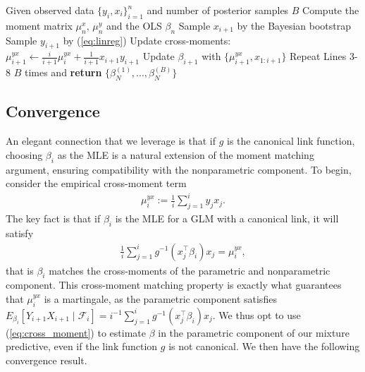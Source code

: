 \documentclass[11pt,a4paper]{article}
\theoremstyle{plain}
\theoremstyle{remark}
\theoremstyle{remark}
\begin{document}
\begin{algorithm}[!h]
\caption{Predictive resampling for GLM}\label{alg:linreg}
\begin{algorithmic}[1]
\State Given observed data $\{y_i, x_i\}_{i=1}^n$ and number of posterior samples $B$
\State Compute the moment matrix $ \mu_n^x ,\,\mu_n^y $ and the OLS $\beta_n$
        \State  Sample $x_{i+1}$ by the Bayesian bootstrap 
        \State  Sample $y_{i+1}$ by (\ref{eq:linreg}) 
        \State  Update cross-moments:
        $\mu^{yx}_{i+1} \gets \frac{i}{i+1}\mu^{yx}_{i} + \frac{1}{i+1}x_{i+1}y_{i+1} $
        \State Update $\beta_{i+1}$ with $\{\mu^{y x}_{i+1}, x_{1:i+1}\}$
  \EndFor
\State Repeat Lines 3-8 $B$ times and \textbf{return} $\{\beta^{(1)}_N,...,\beta^{(B)}_N\}$
\end{algorithmic}
\end{algorithm}



\subsection{Convergence}
An elegant connection that we leverage is that if $g$ is the canonical link function, choosing $\beta_i$ as the MLE is a natural extension of the moment matching argument, ensuring compatibility with the nonparametric component. To begin, consider the empirical cross-moment term
\begin{align*}
     \mu_i^{yx} := \frac{1}{i}\sum_{j = 1}^i y_j x_j.
\end{align*}
The key fact is that if $\beta_i$ is the MLE for a GLM with a canonical link, it will satisfy 
\begin{align}\label{eq:cross_moment}
    \frac{1}{i}\sum_{j = 1}^i g^{-1}\left(x_j^\top \beta_i\right) x_j = \mu_i^{yx},
\end{align}
that is $\beta_i$ matches the cross-moments of the parametric and nonparametric component. This cross-moment matching property is exactly what guarantees that $\mu_i^{yx}$ is a martingale, as the parametric component satisfies $E_{\beta_i}[Y_{i+1}X_{i+1} \mid \mathcal{F}_i] = i^{-1}\sum_{j = 1}^i g^{-1}\left(x_j^\top \beta_i\right) x_j$. We thus opt to use (\ref{eq:cross_moment}) to estimate $\beta$ in the parametric component of our mixture predictive, even if the link function $g$ is not  canonical. We then have the following convergence result.
\end{document}
